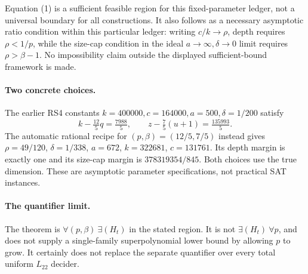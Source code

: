 \documentclass[11pt]{article}
\begin{document}
Equation (1) is a sufficient feasible region for this fixed-parameter ledger,
not a universal boundary for all constructions. It also follows as a
necessary asymptotic ratio condition within this particular ledger: writing
$c/k\to\rho$, depth requires $\rho<1/p$, while the size-cap condition in
the ideal $a\to\infty,\delta\to0$ limit requires $\rho>\beta-1$.
No impossibility claim outside the displayed sufficient-bound framework is made.

\paragraph{Two concrete choices.}
The earlier RS4 constants $k=400000,c=164000,a=500,\delta=1/200$ satisfy
\[
 k-\tfrac{12}{5}q=\tfrac{7988}{5},\qquad
 z-\tfrac75(u+1)=\tfrac{135993}{5}.
\]
The automatic rational recipe for $(p,\beta)=(12/5,7/5)$ instead gives
$\rho=49/120$, $\delta=1/338$, $a=672$, $k=322681$, $c=131761$.
Its depth margin is exactly one and its size-cap margin is
$378319354/845$. Both choices use the true dimension. These are asymptotic
parameter specifications, not practical SAT instances.

\paragraph{The quantifier limit.}
The theorem is $\forall(p,\beta)\ \exists(H_t)$ in the stated region. It is
not $\exists(H_t)\ \forall p$, and does not supply a single-family
superpolynomial lower bound by allowing $p$ to grow. It certainly does not
replace the separate quantifier over every total uniform $L_{22}$ decider.
\end{document}
